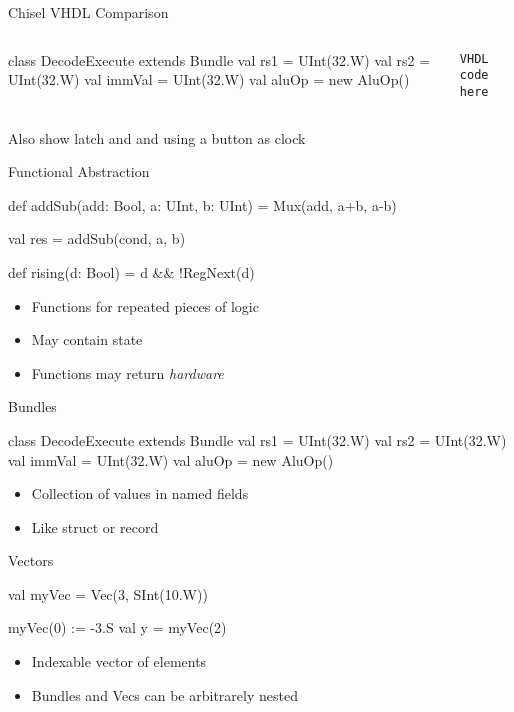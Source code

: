 \begin{frame}[fragile]{Chisel VHDL Comparison}
\begin{columns}
\begin{chisel}
class DecodeExecute extends Bundle {
  val rs1 = UInt(32.W)
  val rs2 = UInt(32.W)
  val immVal = UInt(32.W)
  val aluOp = new AluOp()
}
\end{chisel}
\begin{verbatim}
VHDL code here
\end{verbatim}
\end{columns}
Also show latch and and using a button as clock
\end{frame}


\begin{frame}[fragile]{Functional Abstraction}
\begin{chisel}
  def addSub(add: Bool, a: UInt, b: UInt) =
    Mux(add, a+b, a-b)

  val res = addSub(cond, a, b)
  
  def rising(d: Bool) = d && !RegNext(d)
\end{chisel}
\begin{itemize}
\item Functions for repeated pieces of logic
\item May contain state
\item Functions may return \emph{hardware}
\end{itemize}
\end{frame}


\begin{frame}[fragile]{Bundles}
\begin{chisel}
class DecodeExecute extends Bundle {
  val rs1 = UInt(32.W)
  val rs2 = UInt(32.W)
  val immVal = UInt(32.W)
  val aluOp = new AluOp()
}
\end{chisel}
\begin{itemize}
\item Collection of values in named fields 
\item Like struct or record
\end{itemize}
\end{frame}

\begin{frame}[fragile]{Vectors}
\begin{chisel}
val myVec = Vec(3, SInt(10.W))

myVec(0) := -3.S
val y = myVec(2)
\end{chisel}
\begin{itemize}
\item Indexable vector of elements
\item Bundles and Vecs can be arbitrarely nested
\end{itemize}
\end{frame}

